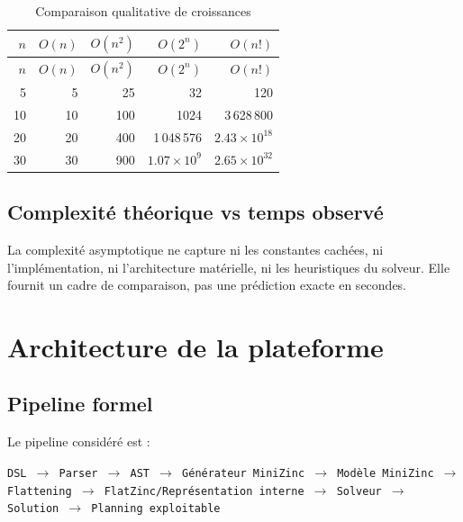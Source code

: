 \documentclass[12pt,a4paper]{article}
\begin{document}
\begin{longtable}{@{}rrrrr@{}}
\caption{Comparaison qualitative de croissances}\label{tab:croissance}\\
\toprule
$n$ & $O(n)$ & $O(n^2)$ & $O(2^n)$ & $O(n!)$ \\
\midrule
\endfirsthead
\toprule
$n$ & $O(n)$ & $O(n^2)$ & $O(2^n)$ & $O(n!)$ \\
\midrule
\endhead
5  & 5   & 25   & 32     & 120 \\
10 & 10  & 100  & 1024   & 3\,628\,800 \\
20 & 20  & 400  & 1\,048\,576 & $2.43\times 10^{18}$ \\
30 & 30  & 900  & $1.07\times 10^{9}$ & $2.65\times 10^{32}$ \\
\bottomrule
\end{longtable}

\subsection{Complexité théorique vs temps observé}
La complexité asymptotique ne capture ni les constantes cachées, ni l'implémentation, ni l'architecture matérielle, ni les heuristiques du solveur. Elle fournit un cadre de comparaison, pas une prédiction exacte en secondes.

\section{Architecture de la plateforme}

\subsection{Pipeline formel}
Le pipeline considéré est :
\begin{center}
\texttt{DSL $\rightarrow$ Parser $\rightarrow$ AST $\rightarrow$ Générateur MiniZinc $\rightarrow$ Modèle MiniZinc $\rightarrow$ Flattening $\rightarrow$ FlatZinc/Représentation interne $\rightarrow$ Solveur $\rightarrow$ Solution $\rightarrow$ Planning exploitable}
\end{center}
\end{document}
